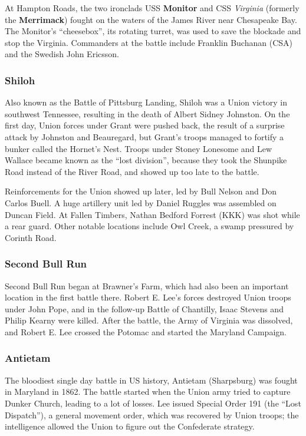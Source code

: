 At Hampton Roads, the two ironclads USS \textbf{Monitor} and CSS \textit{Virginia} (formerly the \textbf{Merrimack})
fought on the waters of the James River near Chesapeake Bay.
The Monitor's ``cheesebox'', its rotating turret, was used to save the blockade and stop the Virginia.
Commanders at the battle include Franklin Buchanan (CSA) and the Swedish John Ericsson.

\subsubsection*{Shiloh}

Also known as the Battle of Pittsburg Landing, Shiloh was a Union victory in southwest Tennessee,
resulting in the death of Albert Sidney Johnston.
On the first day, Union forces under Grant were pushed back,
the result of a surprise attack by Johnston and Beauregard,
but Grant's troops managed to fortify a bunker called the Hornet's Nest.
Troops under Stoney Lonesome and Lew Wallace became known as the ``lost division'',
because they took the Shunpike Road instead of the River Road,
and showed up too late to the battle.

Reinforcements for the Union showed up later, led by Bull Nelson and Don Carlos Buell.
A huge artillery unit led by Daniel Ruggles was assembled on Duncan Field.
At Fallen Timbers, Nathan Bedford Forrest (KKK) was shot while a rear guard.
Other notable locations include Owl Creek, a swamp pressured by Corinth Road.

\subsubsection*{Second Bull Run}

Second Bull Run began at Brawner's Farm, which had also been an important location in the first battle there.
Robert E. Lee's forces destroyed Union troops under John Pope,
and in the follow-up Battle of Chantilly, Isaac Stevens and Philip Kearny were killed.
After the battle, the Army of Virginia was dissolved,
and Robert E. Lee crossed the Potomac and started the Maryland Campaign.

\subsubsection*{Antietam}

The bloodiest single day battle in US history, Antietam (Sharpsburg) was fought in Maryland in 1862.
The battle started when the Union army tried to capture Dunker Church, leading to a lot of losses.
Lee issued Special Order 191 (the ``Lost Dispatch''),
a general movement order, which was recovered by Union troops;
the intelligence allowed the Union to figure out the Confederate strategy.

